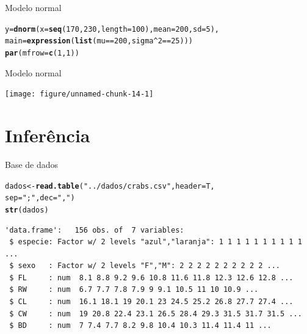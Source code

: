 \documentclass[10pt]{beamer}\usepackage[]{graphicx}\usepackage[]{color}
\makeatletter
\newcommand{\hlnum}[1]{\textcolor[rgb]{0.686,0.059,0.569}{#1}}%
\newcommand{\hlstr}[1]{\textcolor[rgb]{0.192,0.494,0.8}{#1}}%
\newcommand{\hlopt}[1]{\textcolor[rgb]{0,0,0}{#1}}%
\newcommand{\hlstd}[1]{\textcolor[rgb]{0.345,0.345,0.345}{#1}}%
\newcommand{\hlkwb}[1]{\textcolor[rgb]{0.69,0.353,0.396}{#1}}%
\newcommand{\hlkwc}[1]{\textcolor[rgb]{0.333,0.667,0.333}{#1}}%
\newcommand{\hlkwd}[1]{\textcolor[rgb]{0.737,0.353,0.396}{\textbf{#1}}}%
\newenvironment{kframe}{%
 \def\at@end@of@kframe{}%
 \ifinner\ifhmode%
  \def\at@end@of@kframe{\end{minipage}}%
  \begin{minipage}{\columnwidth}%
 \fi\fi%
 \def\FrameCommand##1{\hskip\@totalleftmargin \hskip-\fboxsep
 \colorbox{shadecolor}{##1}\hskip-\fboxsep
     \hskip-\linewidth \hskip-\@totalleftmargin \hskip\columnwidth}%
 \MakeFramed {\advance\hsize-\width
   \@totalleftmargin\z@ \linewidth\hsize
   \@setminipage}}%
 {\par\unskip\endMakeFramed%
 \at@end@of@kframe}
\newenvironment{knitrout}{}{} %
\theoremstyle{definition}
\makeatother
\begin{document}
\begin{frame}[fragile]{Modelo normal}
\begin{knitrout}
\begin{kframe}
\begin{alltt}
     \hlkwc{y} \hlstd{=} \hlkwd{dnorm}\hlstd{(}\hlkwc{x} \hlstd{=} \hlkwd{seq}\hlstd{(}\hlnum{170}\hlstd{,} \hlnum{230}\hlstd{,} \hlkwc{length}\hlstd{=}\hlnum{100}\hlstd{),} \hlkwc{mean} \hlstd{=} \hlnum{200}\hlstd{,} \hlkwc{sd} \hlstd{=} \hlnum{5}\hlstd{),}
     \hlkwc{main} \hlstd{=} \hlkwd{expression}\hlstd{(}\hlkwd{list}\hlstd{(mu} \hlopt{==} \hlnum{200}\hlstd{, sigma}\hlopt{^}\hlnum{2} \hlopt{==} \hlnum{25}\hlstd{)))}
\hlkwd{par}\hlstd{(}\hlkwc{mfrow}\hlstd{=}\hlkwd{c}\hlstd{(}\hlnum{1}\hlstd{,}\hlnum{1}\hlstd{))}
\end{alltt}
\end{kframe}
\end{knitrout}
\end{frame}

\begin{frame}[fragile]{Modelo normal}
\begin{knitrout}\small
{}\color{fgcolor}

{\centering \texttt{[image: figure/unnamed-chunk-14-1]} 

}



\end{knitrout}
\end{frame}

\section{Inferência}

\begin{frame}[fragile=singleslide]{Base de dados}
\begin{knitrout}\small
{}\color{fgcolor}\begin{kframe}
\begin{alltt}
\hlstd{dados} \hlkwb{<-} \hlkwd{read.table}\hlstd{(}\hlstr{"../dados/crabs.csv"}\hlstd{,} \hlkwc{header} \hlstd{= T,}
                    \hlkwc{sep} \hlstd{=} \hlstr{";"}\hlstd{,} \hlkwc{dec} \hlstd{=} \hlstr{","}\hlstd{)}
\hlkwd{str}\hlstd{(dados)}
\end{alltt}
\begin{verbatim}
'data.frame':	156 obs. of  7 variables:
 $ especie: Factor w/ 2 levels "azul","laranja": 1 1 1 1 1 1 1 1 1 1 ...
 $ sexo   : Factor w/ 2 levels "F","M": 2 2 2 2 2 2 2 2 2 2 ...
 $ FL     : num  8.1 8.8 9.2 9.6 10.8 11.6 11.8 12.3 12.6 12.8 ...
 $ RW     : num  6.7 7.7 7.8 7.9 9 9.1 10.5 11 10 10.9 ...
 $ CL     : num  16.1 18.1 19 20.1 23 24.5 25.2 26.8 27.7 27.4 ...
 $ CW     : num  19 20.8 22.4 23.1 26.5 28.4 29.3 31.5 31.7 31.5 ...
 $ BD     : num  7 7.4 7.7 8.2 9.8 10.4 10.3 11.4 11.4 11 ...
\end{verbatim}
\end{kframe}
\end{knitrout}
\end{frame}
\end{document}
